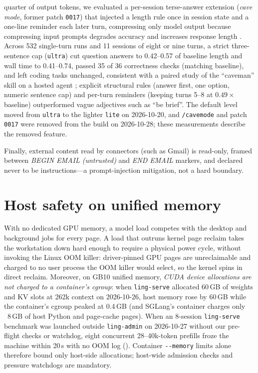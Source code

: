 \documentclass[11pt]{article}
\newcommand{\code}[1]{\texttt{#1}}
\begin{document}
\begin{enumerate}
quarter of output tokens, we evaluated a per-session terse-answer extension (\emph{cave mode},
former patch \code{0017}) that injected a length rule once in session state and a one-line reminder
each later turn, compressing only model output because compressing input prompts degrades accuracy
and increases response length \cite{adeyemi2026cavewoman}. Across 532 single-turn runs and 11
sessions of eight or nine turns, a strict three-sentence cap (\code{ultra}) cut question answers to
0.42--0.57 of baseline length and wall time to 0.41--0.74, passed 35 of 36 correctness checks
(matching baseline), and left coding tasks unchanged, consistent with a paired study of the
``caveman'' skill on a hosted agent \cite{shiryaev2026caveman}; explicit structural rules (answer
first, one option, numeric sentence cap) and per-turn reminders (keeping turns 5--8 at $0.49\times$
baseline) outperformed vague adjectives such as ``be brief''. The default level moved from \code{ultra}
to the lighter \code{lite} on 2026-10-20, and \code{/cavemode} and patch \code{0017} were removed
from the build on 2026-10-28; these measurements describe the removed feature.
\end{enumerate}
Finally, external content read by connectors (such as Gmail) is read-only, framed between
\emph{BEGIN EMAIL (untrusted)} and \emph{END EMAIL} markers, and declared never to be instructions—a
prompt-injection mitigation, not a hard boundary.

\section{Host safety on unified memory}
\label{sec:safety}

With no dedicated GPU memory, a model load competes with the desktop and background jobs for every
page. A load that outruns kernel page reclaim takes the workstation down hard enough to require a
physical power cycle, without invoking the Linux OOM killer: driver-pinned GPU pages are
unreclaimable and charged to no user process the OOM killer would select, so the kernel spins in
direct reclaim. Moreover, on GB10 unified memory, \emph{CUDA device allocations are not charged to
a container's cgroup}: when \code{ling-serve} allocated 60\,GB of weights and KV slots at 262k
context on 2026-10-26, host memory rose by 60\,GB while the container's cgroup peaked at 0.4\,GB
(and SGLang's container charges only ~8\,GB of host Python and page-cache pages). When an
8-session \code{ling-serve} benchmark was launched outside \code{ling-admin} on 2026-10-27 without
our pre-flight checks or watchdog, eight concurrent 28--40k-token prefills froze the machine
within 20\,s with no OOM log (). Container \code{-{}-memory} limits
alone therefore bound only host-side allocations; host-wide admission checks and pressure watchdogs
are mandatory.
\end{document}
